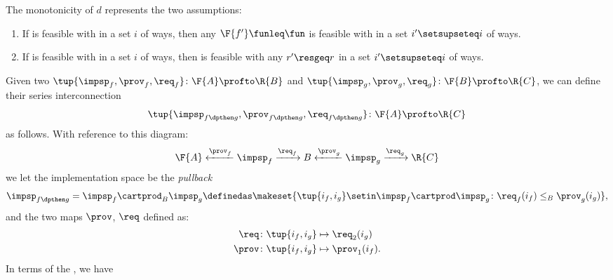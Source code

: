 \noindent The monotonicity of $d$ represents the two assumptions:
\begin{enumerate}
    \item If \fun is feasible with \res in a set $i$ of ways, then any $\F{f'}\funleq \fun$ is feasible with \res in a set $i'\setsupseteq i$ of ways.
    \item If \fun is feasible with \res in a set $i$ of ways, then \fun is feasible with any $r'\resgeq r$ in a set $i'\setsupseteq i$ of ways.
\end{enumerate}

\begin{definition}
    \label{def:seriesdpi}
    Given two  $\tup{\impsp_f,\prov_f,\req_f}\colon \F{A}\profto \R{B}$ and $\tup{\impsp_g,\prov_g,\req_g}\colon \F{B}\profto \R{C}$, we can define their series interconnection
    \begin{equation}
        \tup{\impsp_{f\dpthen g},\prov_{f\dpthen g},\req_{f\dpthen g}}\colon \F{A}\profto \R{C}
    \end{equation}
    as follows.
    With reference to this diagram:
    \begin{equation}
        \F{A} \xleftarrow{\prov_f} \impsp_f \xrightarrow{\req_f} B
        \xleftarrow{\prov_g} \impsp_g \xrightarrow{\req_g} \R{C}
    \end{equation}
    we let the implementation space be the \emph{pullback}
    \begin{equation}
        \begin{aligned}
            \impsp_{f\dpthen g} & = \impsp_f \cartprod_B \impsp_g \definedas \makeset{
                \tup{i_f,i_g} \setin \impsp_f \cartprod \impsp_g \colon
                \req_f(i_f) \leq_{B} \prov_g(i_g)
            }, \\
        \end{aligned}
    \end{equation}
    and the two maps $\prov$, $\req$ defined as:
    \begin{equation}
        \begin{aligned}
            \req  & \colon \tup{i_f,i_g} \mapsto \req_2(i_g) \\
            \prov & \colon  \tup{i_f,i_g} \mapsto \prov_1(i_f).
        \end{aligned}
    \end{equation}
    In terms of the , we have
    \begin{widepar}

\end{widepar}
\end{definition}
